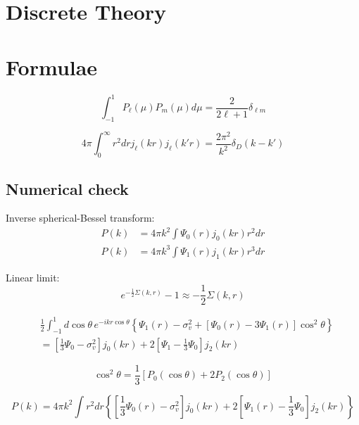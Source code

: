 \documentclass[a4paper,11pt]{article}
\begin{document}
\section{Discrete Theory}

\section{Formulae}

\begin{equation}
  \int_{-1}^1 P_\ell(\mu) P_m(\mu) d\mu = \frac{2}{2 \ell + 1} \delta_{\ell m}
\end{equation}

\begin{equation}
  4\pi \int_0^\infty r^2 dr j_\ell(kr) j_\ell(k'r) =
    \frac{2\pi^2}{k^2} \delta_D(k - k')
\end{equation}

\subsection{Numerical check}

Inverse spherical-Bessel transform:
\begin{align}
  P(k) &= 4 \pi k^2 \int \Psi_0(r) j_0(kr) r^2 dr\\
  P(k) &= 4 \pi k^3 \int \Psi_1(r) j_1(kr) r^3 dr
\end{align}

Linear limit:
\begin{equation}
  e^{-\frac{1}{2} \Sigma(k, r)} - 1 \approx -\frac{1}{2} \Sigma(k, r)
\end{equation}

\begin{equation}
  \begin{split}
  &\frac{1}{2} \int_{-1}^1 \! d\cos\theta \, e^{-ikr \cos\theta}
  \left\{
  \Psi_1(r) - \sigma_v^2 + \left[ \Psi_0(r) - 3 \Psi_1(r) \right] \cos^2 \theta
  \right\}\\
  &= \left[ \frac{1}{3}\Psi_0 - \sigma_v^2 \right] j_0(kr)
     + 2\left[ \Psi_1 - \frac{1}{3}\Psi_0 \right] j_2(kr)
  \end{split}
\end{equation}


\begin{equation}
  \cos^2 \theta = \frac{1}{3}\left[ P_0(\cos\theta) + 2 P_2(\cos\theta) \right]
\end{equation}
  
  
\begin{equation}
  P(k) = 4\pi k^2 \int r^2 dr \left\{
  \left[\frac{1}{3} \Psi_0(r) - \sigma_v^2 \right] j_0(kr)
  + 2 \left[ \Psi_1(r) - \frac{1}{3} \Psi_0 \right] j_2(kr)
  \right\}
\end{equation}
\end{document}
